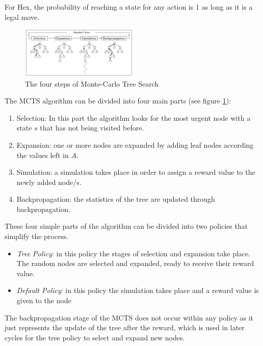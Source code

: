 \documentclass{ba-kecs}
\begin{document}
For Hex, the probability of reaching a state for any action is 1 as long as it is a legal move. 
\begin{figure}
	\centering
	\includegraphics[width=0.5\textwidth]{figure_mcts.jpg}
	\caption{The four steps of Monte-Carlo Tree Search \cite{chaslot2008progressive}}
	\label{fig:mcts}
	\end{figure}
The MCTS algorithm can be divided into four main parts (see figure \ref{fig:mcts}): 
\begin{enumerate}
\item Selection: In this part the algorithm looks for the most urgent node with a state $s$ that has not being visited before.
\item Expansion: one or more nodes are expanded by adding leaf nodes according the values left in $A$.
\item Simulation: a simulation takes place in order to assign a reward value to the newly added node/s.
\item Backpropagation: the statistics of the tree are updated through backpropagation.
\end{enumerate}
These four simple parts of the algorithm can be divided into two policies that simplify the process.
\begin{itemize}
\item \textit{Tree Policy}: in this policy the stages of selection and expansion take place. The random nodes are selected and expanded, ready to receive their reward value.
\item \textit{Default Policy}: in this policy the simulation takes place and a reward value is given to the node 
\end{itemize}
The backpropagation stage of the MCTS does not occur within any policy as it just represents the update of the tree after the reward, which is used in later cycles for the tree policy to select and expand new nodes.
\end{document}
